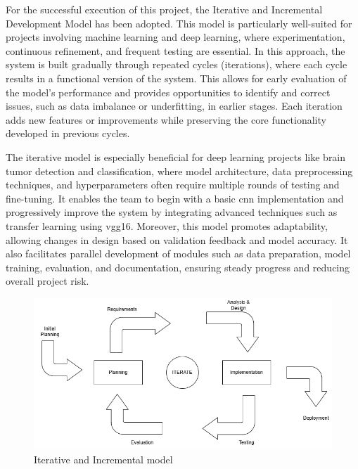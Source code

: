 For the successful execution of this project, the Iterative and Incremental Development Model has been adopted. This model is particularly well-suited for projects involving machine learning and deep learning, where experimentation, continuous refinement, and frequent testing are essential. In this approach, the system is built gradually through repeated cycles (iterations), where each cycle results in a functional version of the system. This allows for early evaluation of the model's performance and provides opportunities to identify and correct issues, such as data imbalance or underfitting, in earlier stages. Each iteration adds new features or improvements while preserving the core functionality developed in previous cycles.

The iterative model is especially beneficial for deep learning projects like brain tumor detection and classification, where model architecture, data preprocessing techniques, and hyperparameters often require multiple rounds of testing and fine-tuning. It enables the team to begin with a basic \gls{cnn} implementation and progressively improve the system by integrating advanced techniques such as transfer learning using \gls{vgg16}. Moreover, this model promotes adaptability, allowing changes in design based on validation feedback and model accuracy. It also facilitates parallel development of modules such as data preparation, model training, evaluation, and documentation, ensuring steady progress and reducing overall project risk.
\begin{figure}[h]
    \centering
    \includegraphics[width=1\linewidth]{Images/model.png}
    \caption{Iterative and Incremental model}
    \label{fig:enter-label}
\end{figure}

